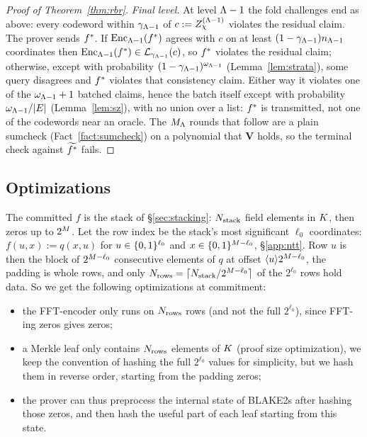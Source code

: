 \begin{proof}[Proof of Theorem~\ref{thm:rbr}]
\medskip\noindent\emph{Final level.}
At level $\Lambda - 1$ the fold challenges end as above: every codeword within $\gamma_{\Lambda-1}$ of $c := Z^{(\Lambda-1)}_\chi$ violates the residual claim. The prover sends $f^{\ast}$. If $\mathrm{Enc}_{\Lambda-1}(f^{\ast})$ agrees with $c$ on at least $(1 - \gamma_{\Lambda-1}) n_{\Lambda-1}$ coordinates then $\mathrm{Enc}_{\Lambda-1}(f^{\ast}) \in \mathcal{L}_{\gamma_{\Lambda-1}}(c)$, so $f^{\ast}$ violates the residual claim; otherwise, except with probability $(1 - \gamma_{\Lambda-1})^{\omega_{\Lambda-1}}$ (Lemma~\ref{lem:strata}), some query disagrees and $f^{\ast}$ violates that consistency claim. Either way it violates one of the $\omega_{\Lambda-1}+1$ batched claims, hence the batch itself except with probability $\omega_{\Lambda-1}/|E|$ (Lemma~\ref{lem:sz}), with no union over a list: $f^{\ast}$ is transmitted, not one of the codewords near an oracle. The $M_\Lambda$ rounds that follow are a plain sumcheck (Fact~\ref{fact:sumcheck}) on a polynomial that $\mathbf{V}$ holds, so the terminal check against $\widetilde{f^{\ast}}$ fails.

\end{proof}


\subsection{Optimizations}\label{sec:pcs-opt}

The committed $f$ is the stack of \S\ref{sec:stacking}: $N_{\mathrm{stack}}$ field elements in $K$, then zeros up to $2^{M}$. Let the row index be the stack's most significant $\ell_0$ coordinates: $f(u, x) := q(x, u)$ for $u \in \{0,1\}^{\ell_0}$ and $x \in \{0,1\}^{M - \ell_0}$, \S\ref{app:ntt}. Row $u$ is then the block of $2^{M - \ell_0}$ consecutive elements of $q$ at offset $\langle u \rangle 2^{M - \ell_0}$, the padding is whole rows, and only $N_{\mathrm{rows}}=\lceil N_{\mathrm{stack}}/2^{M-\ell_0}\rceil$ of the $2^{\ell_0}$ rows hold data. So we get the following optimizations at commitment:
\begin{itemize}[itemsep=1pt,topsep=2pt]
\item the FFT-encoder only runs on $N_{\mathrm{rows}}$ rows (and not the full $2^{\ell_0}$), since FFT-ing zeros gives zeros;
\item a Merkle leaf only contains $N_{\mathrm{rows}}$ elements of $K$ (proof size optimization), we keep the convention of hashing the full $2^{\ell_0}$ values for simplicity, but we hash them in reverse order, starting from the padding zeros;
\item the prover can thus preprocess the internal state of BLAKE2s after hashing those zeros, and then hash the useful part of each leaf starting from this state.
\end{itemize}

